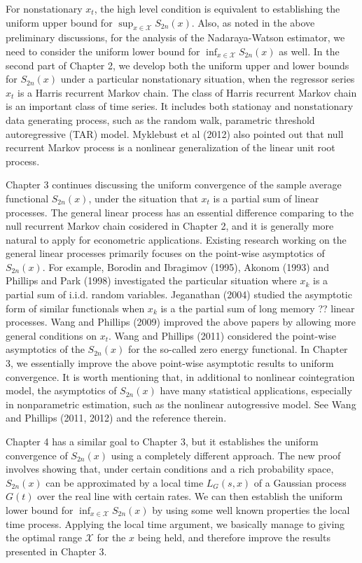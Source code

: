 For nonstationary $x_t$, the high level condition is equivalent to establishing the uniform upper bound for $\sup_{x \in \mathcal{X}} S_{2n}(x)$. Also, as noted in the above preliminary discussions, for the analysis of the Nadaraya-Watson estimator, we need to consider the uniform lower bound for $\inf_{x \in \mathcal{X}} S_{2n}(x)$ as well. In the second part of Chapter 2, we develop both the uniform upper and lower bounds for $S_{2n}(x)$ under a particular nonstationary situation, when the regressor series $x_t$ is a  Harris recurrent Markov chain. The class of Harris recurrent Markov chain is an important class of time series. It includes both stationay and nonstationary data generating process, such as the random walk, parametric threshold autoregressive (TAR) model. Myklebust et al (2012) also pointed out that null recurrent Markov process is a nonlinear generalization of the linear unit root process.

Chapter 3 continues discussing the uniform convergence of the sample average functional $S_{2n}(x)$, under the situation that $x_t$ is a partial sum of linear processes. The general linear process has an essential difference comparing to the null recurrent Markov chain cosidered in Chapter 2, and it is generally more natural to apply for econometric applications. Existing research working on the general linear processes primarily focuses on the point-wise asymptotics of $S_{2n}(x)$. For example, Borodin and Ibragimov (1995), Akonom (1993) and Phillips and Park (1998) investigated the particular situation where $x_{k}$ is a partial sum of i.i.d. random variables. Jeganathan (2004) studied the asymptotic form of similar functionals when $x_{k}$ is a the partial sum of long memory ?? linear processes. Wang and Phillips (2009) improved the above papers by allowing more general conditions on $x_t$.  Wang and Phillips (2011) considered the point-wise asymptotics of the $S_{2n}(x)$ for the so-called zero energy functional.  In Chapter 3, we essentially improve the above point-wise asymptotic results to uniform convergence. It is worth mentioning that, in additional to nonlinear cointegration model, the asymptotics of $S_{2n}(x)$ have many statistical applications, especially in nonparametric estimation, such as the nonlinear autogressive model. See Wang and Phillips (2011, 2012) and the reference therein.


Chapter 4 has a similar goal to Chapter 3, but it establishes the uniform convergence of $S_{2n}(x)$ using a completely different approach. The new proof involves showing that, under certain conditions and a rich probability space, $S_{2n}(x)$ can be approximated by a local time $L_G(s, x)$ of a Gaussian process $G(t)$ over the real line with certain rates.  We can then establish the uniform lower bound for $\inf_{x \in \mathcal X} S_{2n}(x)$ by using some well known properties the local time process. Applying the local time argument, we basically manage to giving the optimal range $\mathcal{X}$ for the $x$ being held, and therefore improve the results presented in Chapter 3.

